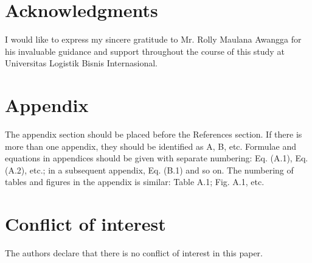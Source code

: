 \documentclass[final,3p,times,twocolumn]{elsarticle}
\begin{document}


\section*{Acknowledgments}
I would like to express my sincere gratitude to Mr. Rolly Maulana Awangga for his invaluable guidance and support throughout the course of this study at Universitas Logistik Bisnis Internasional.

\section*{Appendix}
The appendix section should be placed before the References section. 
If there is more than one appendix, they should be identified as A, B, etc. 
Formulae and equations in appendices should be given with separate numbering: Eq. (A.1), Eq. (A.2), etc.; in a subsequent appendix, Eq. (B.1) and so on. 
The numbering of tables and figures in the appendix is similar: Table A.1; Fig. A.1, etc.

\section*{Conflict of interest}
The authors declare that there is no conflict of interest in this paper.
\end{document}
